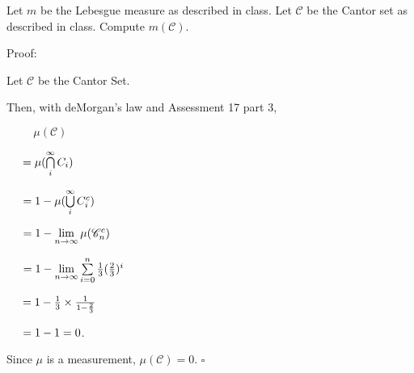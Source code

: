 \documentclass[12pt]{article}
\begin{document}
Let $m$ be the Lebesgue measure as described in class.  Let $\mathscr{C}$ be the Cantor set as described in class.  Compute $m(\mathscr{C})$.

Proof:

Let $\mathscr{C}$ be the Cantor Set.

Then, with deMorgan's law and Assessment 17 part 3,

$\hspace{1cm}\mu(\mathscr{C})$

$\hspace{0.5cm}= \mu(\bigcap\limits_{i}^{\infty} C_i)$

$\hspace{0.5cm}= 1 - \mu(\bigcup\limits_{i}^{\infty} C_i^c)$

$\hspace{0.5cm}= 1 - \lim\limits_{n \to \infty} \mu(\mathscr{C}_n^c)$

$\hspace{0.5cm}= 1 - \lim\limits_{n \to \infty} \sum\limits_{i=0}^{n} \frac{1}{3} (\frac{2}{3})^i$

$\hspace{0.5cm}= 1 - \frac{1}{3}\times\frac{1}{1-\frac{2}{3}}$

$\hspace{0.5cm}= 1 - 1  = 0$.

Since $\mu$ is a measurement, $\mu({\mathscr{C}}) = 0$. $\square$
\end{document}

